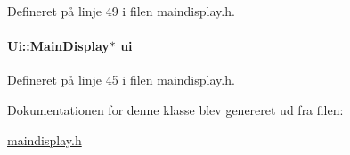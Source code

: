 Defineret på linje 49 i filen maindisplay.\+h.

\paragraph[{\texorpdfstring{ui}{ui}}]{\setlength{\rightskip}{0pt plus 5cm}Ui\+::\+Main\+Display$\ast$ ui\hspace{0.3cm}{\ttfamily [private]}}\hypertarget{class_main_display_ade778ccd9663d675377dae469e67b043}{}\label{class_main_display_ade778ccd9663d675377dae469e67b043}


Defineret på linje 45 i filen maindisplay.\+h.



Dokumentationen for denne klasse blev genereret ud fra filen\+:\begin{DoxyCompactItemize}
\item 
\hyperlink{maindisplay_8h}{maindisplay.\+h}\end{DoxyCompactItemize}
